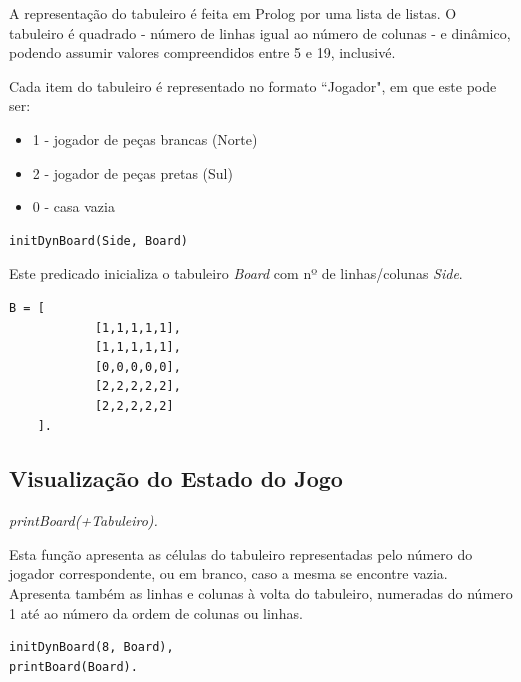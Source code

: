\documentclass[15pt,a4paper]{article}
\begin{document}
A representação do tabuleiro é feita em Prolog por uma lista de listas.
O tabuleiro é quadrado - número de linhas igual ao número de colunas - e dinâmico, podendo assumir valores compreendidos entre 5 e 19, inclusivé.

Cada item do tabuleiro é representado no formato ``Jogador", em que este pode ser:
\begin{itemize}
\item 1 - jogador de peças brancas (Norte)
\item 2 - jogador de peças pretas (Sul)
\item 0 - casa vazia
\end{itemize}

\begin{lstlisting}
initDynBoard(Side, Board)
\end{lstlisting}

Este predicado inicializa o tabuleiro \textit{Board} com nº de linhas/colunas \textit{Side}.

\begin{lstlisting}
B = [
			[1,1,1,1,1],
			[1,1,1,1,1],
			[0,0,0,0,0],
			[2,2,2,2,2],
			[2,2,2,2,2]
    ].
\end{lstlisting}


\subsection{Visualização do Estado do Jogo}

\textit{printBoard(+Tabuleiro).}

Esta função apresenta as células do tabuleiro representadas pelo número do jogador correspondente, ou em branco, caso a mesma se encontre vazia.
Apresenta também as linhas e colunas à volta do tabuleiro, numeradas do número 1 até ao número da ordem de colunas ou linhas.

\begin{lstlisting}
initDynBoard(8, Board),
printBoard(Board).
\end{lstlisting}
\end{document}
